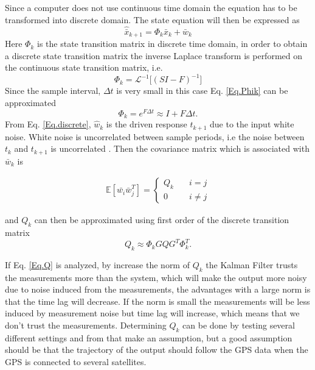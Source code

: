 Since a computer does not use continuous time domain the equation has to be transformed into discrete domain. The state equation will then be expressed as
\begin{equation}
\hat{\bar{x}}_{k+1} = \Phi_k \bar{x}_k +  \bar{w}_k	
\label{Eq.discrete}
\end{equation}
Here $\Phi_k$ is the state transition matrix in discrete time domain, in order to  obtain a discrete state transition matrix the inverse Laplace transform is performed on the continuous state transition matrix, i.e.
\begin{equation}
\Phi_k = \mathcal{L}^{-1}\big[(SI-F)^{-1}\big]
\label{Eq.Phik}
\end{equation}
Since the sample interval, $\Delta t$ is very small in this case Eq. \eqref{Eq.Phik} can be approximated 
\begin{equation}
\Phi_k = e^{F\Delta t} \approx I + F \Delta t 
\label{Eq.Final_Phik}.
\end{equation}
From Eq. \eqref{Eq.discrete}, $\hat{w}_k$ is the driven response $t_{k+1}$ due to the input white noise. White noise is uncorrelated between sample periods, i.e the noise between $t_k$ and $t_{k+1}$ is uncorrelated \cite{signal_process}. Then the covariance matrix which is associated with $\bar{w}_k$ is \cite{signal_process}

\begin{align}
\mathbb{E}[\bar{w_i}\bar{w}_j^T] =
\begin{cases}
  Q_k &\quad i=j\\    
  0 &\quad i\neq j   
\end{cases}
\end{align}

and $Q_k$ can then be approximated using first order of the discrete transition matrix \cite{Discrete_kalman}
\begin{equation}
Q_k\approx \Phi_k GQG^T \Phi_k^T.
\label{Eq.Q_k}
\end{equation}

If Eq. \eqref{Eq.Q} is analyzed, by increase the norm of $Q_k$ the Kalman Filter trusts the measurements more than the system, which will make the output more noisy due to noise induced from the measurements, the advantages with a large norm is that the time lag will decrease. If the norm is small the measurements will be less induced by measurement noise but time lag will increase, which means that we don't trust the measurements. Determining $Q_k$ can be done by testing several different settings and from that make an assumption, but a good assumption should be that the trajectory of the output should follow the GPS data when the GPS is connected to several satellites.\\



